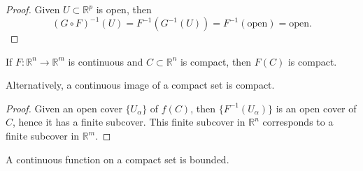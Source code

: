 \begin{itemize}
\begin{theorem}
              \begin{proof}
                  Given $U\subset \mathbb{R}^p$ is open, then
                  \begin{equation}
                      (G\circ F)^{-1}(U) = F^{-1}(G^{-1}(U)) = F^{-1}(\text{open}) = \text{open.}
                  \end{equation}
              \end{proof}
          \end{theorem}
          \begin{theorem}
              If $F:\mathbb{R}^n\rightarrow \mathbb{R}^m$ is continuous and $C\subset \mathbb{R}^n$ is compact, then $F(C)$ is compact.
              \vspace{2mm}

              Alternatively, a continuous image of a compact set is compact.
          \end{theorem}
          \begin{proof}
              Given an open cover $\{U_\alpha\}$ of $f(C)$, then $\{F^{-1}(U_\alpha)\}$ is an open cover of $C$, hence it has a finite subcover. This finite subcover in $\mathbb{R}^n$ corresponds to a finite subcover in $\mathbb{R}^m$.
          \end{proof}
          \begin{corollary}
              A continuous function on a compact set is bounded.
          \end{corollary}
          
\end{itemize}